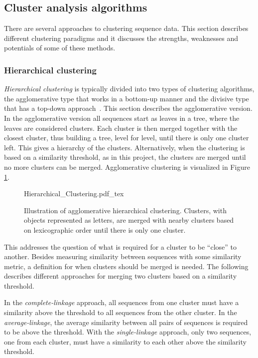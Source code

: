 \subsection{Cluster analysis algorithms}

There are several approaches to clustering sequence data. This section
describes different clustering paradigms and it discusses the strengths,
weaknesses and potentials of some of these methods.

\subsubsection{Hierarchical clustering}

\emph{Hierarchical clustering} is typically divided into two types of
clustering algorithms, the agglomerative type that works in a bottom-up manner
and the divisive type that has a top-down approach~\cite{dong}. This section
describes the agglomerative version. In the agglomerative version all sequences
start as leaves in a tree, where the leaves are considered clusters. Each
cluster is then merged together with the closest cluster, thus building a tree,
level for level, until there is only one cluster left. This gives a hierarchy
of the clusters. Alternatively, when the clustering is based on a similarity
threshold, as in this project, the clusters are merged until no more clusters
can be merged. Agglomerative clustering is visualized in Figure
\ref{fig:hierarchical_clustering}.

\begin{figure}[h!]
  \centering
  \def\svgwidth{\columnwidth}
  {Hierarchical_Clustering.pdf_tex}
  \caption{Illustration of agglomerative hierarchical clustering. Clusters,
    with objects represented as letters, are merged with nearby clusters based
    on lexicographic order until there is only one cluster.}
  \label{fig:hierarchical_clustering}
\end{figure}

This addresses the question of what is required for a cluster to be ``close''
to another. Besides measuring similarity between sequences with some similarity
metric, a definition for when clusters should be merged is needed. The
following describes different approaches for merging two clusters based on a
similarity threshold.

In the \textit{complete-linkage} approach, all sequences from one cluster must
have a similarity above the threshold to all sequences from the other cluster.
In the \textit{average-linkage}, the average similarity between all pairs of
sequences is required to be above the threshold. With the
\textit{single-linkage} approach, only two sequences, one from each cluster,
must have a similarity to each other above the similarity threshold.

